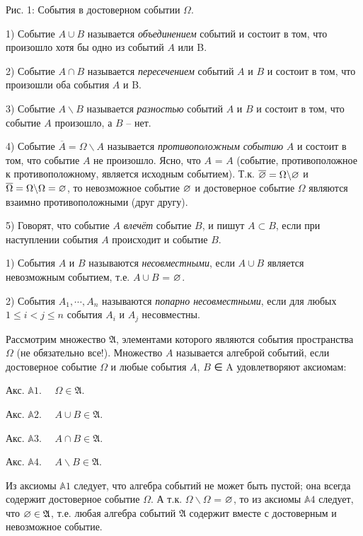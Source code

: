 Рис. 1: События в достоверном событии $\Omega$.
\begin{definition}
1) Событие $A \cup B$ называется \textit{объединением} событий и состоит в том, что произошло хотя бы одно из событий $A$ или B.

2) Событие $A\cap B$ называется \textit{пересечением} событий $A$ и $B$ и состоит в
том, что произошли оба события $A$ и B.

3) Событие $A\backslash B$ называется \textit{разностью} событий $A$ и $B$ и состоит в том,
что событие $A$ произошло, а $B$ -- нет.

4) Событие $\overline{A}=\Omega\backslash A$ называется \textit{противоположным событию} $A$ и состоит в том, что событие $A$ не произошло. Ясно, что $A$ = $A$ (событие, противоположное к противоположному, является исходным событием).
Т.к. $\overline{\varnothing}=\Omega\backslash\varnothing$ и $\overline{\Omega}=\Omega\backslash\Omega=\varnothing$, то невозможное событие $\varnothing$ и
достоверное событие $\Omega$ являются взаимно противоположными (друг другу).

5) Говорят, что событие $A$ \textit{влечёт} событие $B$, и пишут $A\subset B$, если при
наступлении события $A$ происходит и событие $B$.
\end{definition}


\begin{definition}
1) События $A$ и $B$ называются \textit{несовместными}, если
$A\cup B$ является невозможным событием, т.е. $A\cup B$ = $\varnothing$.

2) События $A_1,\cdots,A_n$ называются \textit{попарно несовместными}, если для любых $1\leq i<j\leq n$ события $A_i$ и $A_j$ несовместны.
\end{definition}

\begin{definition}
Рассмотрим множество $\mathfrak{A}$, элементами которого являются события пространства $\Omega$ (не обязательно все!). Множество $A$ называется
алгеброй событий, если достоверное событие $\Omega$ и любые события $A$, $B$ ∈ A
удовлетворяют аксиомам:

Акс. $\mathbb{A}1$.$\quad$ $\Omega\in\mathfrak{A}$.

Акс. $\mathbb{A}2$.$\quad$ $A\cup B\in\mathfrak{A}$.

Акс. $\mathbb{A}3$.$\quad$ $A\cap B\in\mathfrak{A}$.

Акс. $\mathbb{A}4$.$\quad$ $A\backslash B\in\mathfrak{A}$.


Из аксиомы $\mathbb{A}1$ следует, что алгебра событий не может быть пустой; она
всегда содержит достоверное событие $\Omega$. А т.к. $\Omega \backslash \Omega$ = $\varnothing$, то из аксиомы $\mathbb{A}4$ следует, что $\varnothing\in\mathfrak{A}$, т.е. любая алгебра событий $\mathfrak{A}$ содержит вместе с достоверным и невозможное событие.
\end{definition}

